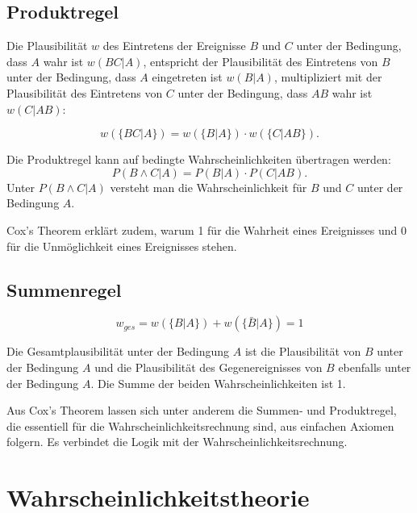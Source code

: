 \documentclass[]{dsadokumentation}
\begin{document}
\subsection{Produktregel}

Die Plausibilität $w$ des Eintretens der Ereignisse $B$ und $C$ unter der Bedingung, dass $A$ wahr ist $w(BC|A)$,
entspricht der Plausibilität des Eintretens von $B$ unter der Bedingung, dass $A$ eingetreten ist $w(B|A)$,
multipliziert mit der Plausibilität des Eintretens von $C$ unter der Bedingung, dass $AB$ wahr ist $w(C|AB)$:

\begin {displaymath}
w(\{BC|A\})=w(\{B|A\})\cdot w(\{C|AB\}) .
\end{displaymath}

\noindent Die Produktregel kann auf bedingte Wahrscheinlichkeiten übertragen werden:
\begin {displaymath}
P(B \wedge C|A) = P(B|A)\cdot P(C|AB).
\end{displaymath}
Unter $P(B \wedge C|A)$ versteht man die Wahrscheinlichkeit für $B$ und $C$ unter der Bedingung $A$.

Cox's Theorem erklärt zudem, warum 1 für die Wahrheit eines Ereignisses und 0 für die Unmöglichkeit eines Ereignisses stehen.

\subsection{Summenregel}
\begin{displaymath}
w_{ges}=w(\{B|A\}) + w(\{\bar{B}|A\})= 1
\end{displaymath}

Die Gesamtplausibilität unter der Bedingung $A$ ist die Plausibilität von $B$ unter der Bedingung $A$
und die Plausibilität des Gegenereignisses von $B$ ebenfalls unter der Bedingung $A$. Die Summe der beiden Wahrscheinlichkeiten ist 1.

Aus Cox's Theorem lassen sich unter anderem die Summen- und Produktregel, die essentiell für die Wahrscheinlichkeitsrechnung sind, aus einfachen Axiomen folgern.
Es verbindet die Logik mit der Wahrscheinlichkeitsrechnung.

\section{Wahrscheinlichkeitstheorie}\label{k4.2.bayes}
\end{document}
